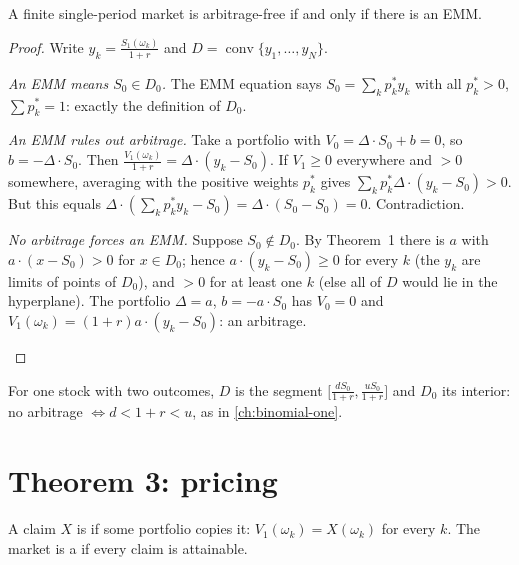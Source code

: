 \begin{theorem}[Theorem~2]
\label{thm:ftap}
A finite single-period market is arbitrage-free if and only if there is an EMM.
\end{theorem}
\begin{proof}
Write $y_k=\frac{S_1(\omega_k)}{1+r}$ and $D=\operatorname{conv}\{y_1,\dots,y_N\}$.
\begin{steps}
  \item \emph{An EMM means $S_0\in D_0$.} The EMM equation says $S_0=\sum_kp^*_ky_k$ with all $p^*_k>0$, $\sum p^*_k=1$: exactly the definition of $D_0$.
  \item \emph{An EMM rules out arbitrage.} Take a portfolio with $V_0=\Delta\cdot S_0+b=0$, so $b=-\Delta\cdot S_0$. Then $\frac{V_1(\omega_k)}{1+r}=\Delta\cdot(y_k-S_0)$. If $V_1\ge0$ everywhere and $>0$ somewhere, averaging with the positive weights $p^*_k$ gives $\sum_kp^*_k\Delta\cdot(y_k-S_0)>0$. But this equals $\Delta\cdot(\sum_kp^*_ky_k-S_0)=\Delta\cdot(S_0-S_0)=0$. Contradiction.
  \item \emph{No arbitrage forces an EMM.} Suppose $S_0\notin D_0$. By Theorem~1 there is $a$ with $a\cdot(x-S_0)>0$ for $x\in D_0$; hence $a\cdot(y_k-S_0)\ge0$ for every $k$ (the $y_k$ are limits of points of $D_0$), and $>0$ for at least one $k$ (else all of $D$ would lie in the hyperplane). The portfolio $\Delta=a$, $b=-a\cdot S_0$ has $V_0=0$ and $V_1(\omega_k)=(1+r)a\cdot(y_k-S_0)$: an arbitrage. \qedhere
\end{steps}
\end{proof}

For one stock with two outcomes, $D$ is the segment $\big[\frac{dS_0}{1+r},\frac{uS_0}{1+r}\big]$ and $D_0$ its interior: no arbitrage $\iff d<1+r<u$, as in \cref{ch:binomial-one}.

\section{Theorem 3: pricing}

\begin{definition}
A claim $X$ is  if some portfolio copies it: $V_1(\omega_k)=X(\omega_k)$ for every $k$. The market is a  if every claim is attainable.
\end{definition}

